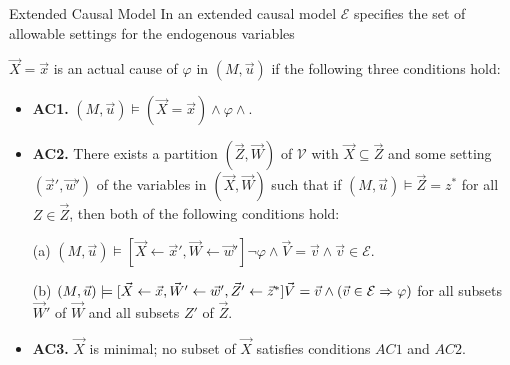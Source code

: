 \begin{frame}{Extended Causal Model}
    In an extended causal model $\mathcal{E}$ specifies the set of allowable settings for the endogenous variables
    \begin{definition}
        $\vec X = \vec x$ is an actual cause of $\varphi$ in $(M,\vec u)$ if the following three conditions hold:
        \begin{itemize}
            \item  \textbf{AC1.} $(M,\vec u)\models (\vec X = \vec x) \wedge \varphi \wedge $.
            \item  \textbf{AC2. }There exists a partition $(\vec Z, \vec W)$ of $\mathcal{V}$ with $\vec X \subseteq \vec Z$ and some setting $(\vec x',\vec w')$ of the variables in $(\vec X,\vec W)$ such that if $(M,\vec u)\models \vec Z = z^*$ for all $Z\in \vec Z$, then both of the following conditions hold:
    
                  (a) $(M,\vec u)\models[\vec X \leftarrow \vec x', \vec W \leftarrow \vec w']\neg \varphi 
                  \wedge \vec V = \vec v
                  \wedge  \vec v \in \mathcal{E}$.
    
                  (b) $(M,\vec u)\models[\vec X\leftarrow \vec x, \vec W' 
                  \leftarrow \vec w', \vec Z'\leftarrow \vec z^*]
                  \vec V = \vec v \wedge (\vec v \in \mathcal{E} \Rightarrow \varphi)$
                      for all subsets $\vec W'$ of $\vec W$ and all subsets $Z'$ of $\vec Z$.
    
            \item  \textbf{AC3.} $\vec X$ is minimal; no subset of $\vec X$ satisfies conditions $AC1$ and $AC2$.
        \end{itemize}
    \end{definition}
\end{frame}